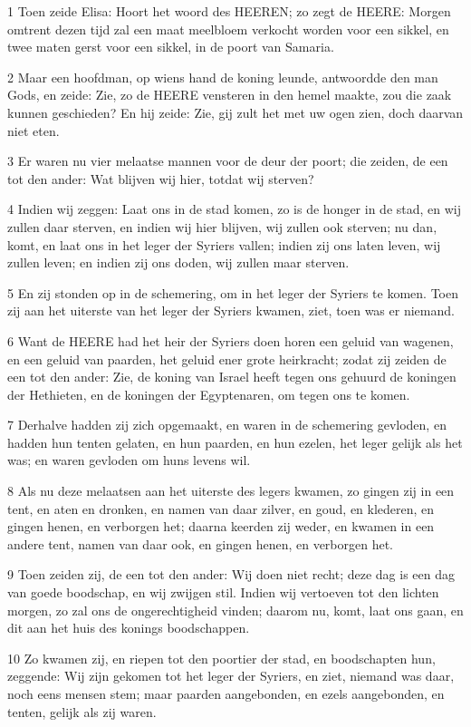 \par 1 Toen zeide Elisa: Hoort het woord des HEEREN; zo zegt de HEERE: Morgen omtrent dezen tijd zal een maat meelbloem verkocht worden voor een sikkel, en twee maten gerst voor een sikkel, in de poort van Samaria.
\par 2 Maar een hoofdman, op wiens hand de koning leunde, antwoordde den man Gods, en zeide: Zie, zo de HEERE vensteren in den hemel maakte, zou die zaak kunnen geschieden? En hij zeide: Zie, gij zult het met uw ogen zien, doch daarvan niet eten.
\par 3 Er waren nu vier melaatse mannen voor de deur der poort; die zeiden, de een tot den ander: Wat blijven wij hier, totdat wij sterven?
\par 4 Indien wij zeggen: Laat ons in de stad komen, zo is de honger in de stad, en wij zullen daar sterven, en indien wij hier blijven, wij zullen ook sterven; nu dan, komt, en laat ons in het leger der Syriers vallen; indien zij ons laten leven, wij zullen leven; en indien zij ons doden, wij zullen maar sterven.
\par 5 En zij stonden op in de schemering, om in het leger der Syriers te komen. Toen zij aan het uiterste van het leger der Syriers kwamen, ziet, toen was er niemand.
\par 6 Want de HEERE had het heir der Syriers doen horen een geluid van wagenen, en een geluid van paarden, het geluid ener grote heirkracht; zodat zij zeiden de een tot den ander: Zie, de koning van Israel heeft tegen ons gehuurd de koningen der Hethieten, en de koningen der Egyptenaren, om tegen ons te komen.
\par 7 Derhalve hadden zij zich opgemaakt, en waren in de schemering gevloden, en hadden hun tenten gelaten, en hun paarden, en hun ezelen, het leger gelijk als het was; en waren gevloden om huns levens wil.
\par 8 Als nu deze melaatsen aan het uiterste des legers kwamen, zo gingen zij in een tent, en aten en dronken, en namen van daar zilver, en goud, en klederen, en gingen henen, en verborgen het; daarna keerden zij weder, en kwamen in een andere tent, namen van daar ook, en gingen henen, en verborgen het.
\par 9 Toen zeiden zij, de een tot den ander: Wij doen niet recht; deze dag is een dag van goede boodschap, en wij zwijgen stil. Indien wij vertoeven tot den lichten morgen, zo zal ons de ongerechtigheid vinden; daarom nu, komt, laat ons gaan, en dit aan het huis des konings boodschappen.
\par 10 Zo kwamen zij, en riepen tot den poortier der stad, en boodschapten hun, zeggende: Wij zijn gekomen tot het leger der Syriers, en ziet, niemand was daar, noch eens mensen stem; maar paarden aangebonden, en ezels aangebonden, en tenten, gelijk als zij waren.
